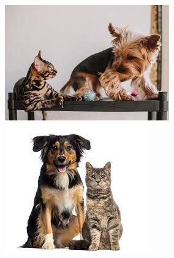 \begin{figure}[H]
\centering
\begin{minipage}{0.3\textwidth}%
 \includegraphics[width=\textwidth]{Graphics/Images/image_13.jpg}
 \caption{ }
 \label{fig:13}
\end{minipage}%
\begin{minipage}{0.3\textwidth}
 \includegraphics[width=\textwidth]{Graphics/Images/image_14.jpg}
 \caption{ }
 \label{fig:14}
\end{minipage}
\begin{minipage}{0.3\textwidth}

\end{minipage}
\end{figure}

